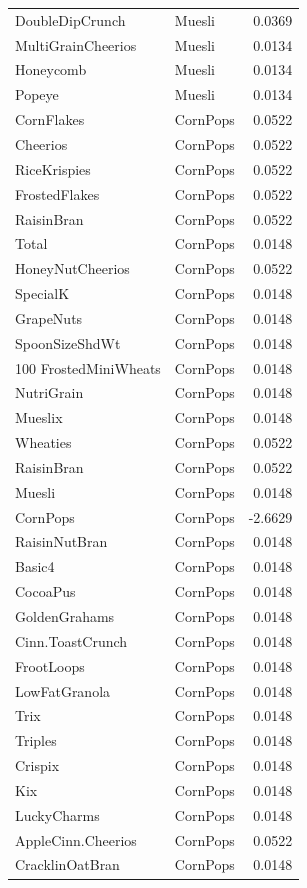 \begin{longtable}{llr}
DoubleDipCrunch & Muesli & 0.0369 \\
MultiGrainCheerios & Muesli & 0.0134 \\
Honeycomb & Muesli & 0.0134 \\
Popeye & Muesli & 0.0134 \\
CornFlakes & CornPops & 0.0522 \\
Cheerios & CornPops & 0.0522 \\
RiceKrispies & CornPops & 0.0522 \\
FrostedFlakes & CornPops & 0.0522 \\
RaisinBran & CornPops & 0.0522 \\
Total & CornPops & 0.0148 \\
HoneyNutCheerios & CornPops & 0.0522 \\
SpecialK & CornPops & 0.0148 \\
GrapeNuts & CornPops & 0.0148 \\
SpoonSizeShdWt & CornPops & 0.0148 \\
100%
FrostedMiniWheats & CornPops & 0.0148 \\
NutriGrain & CornPops & 0.0148 \\
Mueslix & CornPops & 0.0148 \\
Wheaties & CornPops & 0.0522 \\
RaisinBran & CornPops & 0.0522 \\
Muesli & CornPops & 0.0148 \\
CornPops & CornPops & -2.6629 \\
RaisinNutBran & CornPops & 0.0148 \\
Basic4 & CornPops & 0.0148 \\
CocoaPus & CornPops & 0.0148 \\
GoldenGrahams & CornPops & 0.0148 \\
Cinn.ToastCrunch & CornPops & 0.0148 \\
FrootLoops & CornPops & 0.0148 \\
LowFatGranola & CornPops & 0.0148 \\
Trix & CornPops & 0.0148 \\
Triples & CornPops & 0.0148 \\
Crispix & CornPops & 0.0148 \\
Kix & CornPops & 0.0148 \\
LuckyCharms & CornPops & 0.0148 \\
AppleCinn.Cheerios & CornPops & 0.0522 \\
CracklinOatBran & CornPops & 0.0148 \\

\end{longtable}

